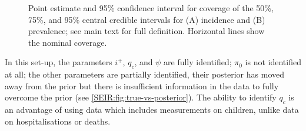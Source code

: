 \documentclass[thesis.tex]{subfiles}
\begin{document}
\begin{figure}
    \caption[Coverage of simulation study (derived quantities)]{%
        Point estimate and 95\% confidence interval for coverage of the 50\%, 75\%, and 95\% central credible intervals for (A) incidence and (B) prevalence; see main text for full definition.
        Horizontal lines show the nominal coverage.
    }
    \label{SEIR:fig:sim-inc-prev}
\end{figure}


In this set-up, the parameters $i^+$, $q_c$, and $\psi$ are fully identified; $\pi_0$ is not identified at all; the other parameters are partially identified, their posterior has moved away from the prior but there is insufficient information in the data to fully overcome the prior (see \cref{SEIR:fig:true-vs-posterior}).
The ability to identify $q_c$ is an advantage of using data which includes measurements on children, unlike data on hospitalisations or deaths.
\end{document}
